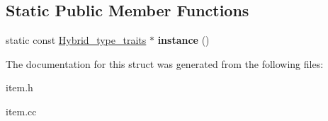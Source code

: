 \subsection*{Static Public Member Functions}
\begin{DoxyCompactItemize}
\item 
\mbox{\label{structHybrid__type__traits_a5bb8206c2bc546bad6e991d3b11f5ec1}} 
static const \mbox{\hyperlink{structHybrid__type__traits}{Hybrid\+\_\+type\+\_\+traits}} $\ast$ {\bfseries instance} ()
\end{DoxyCompactItemize}


The documentation for this struct was generated from the following files\+:\begin{DoxyCompactItemize}
\item 
item.\+h\item 
item.\+cc\end{DoxyCompactItemize}
